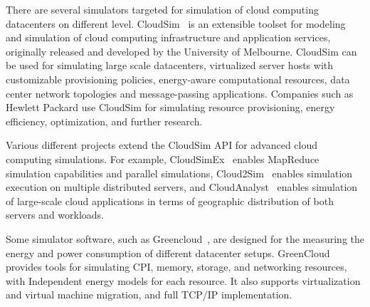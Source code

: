 There are several simulators targeted for simulation of cloud computing datacenters on different level. CloudSim~\cite{Calheiros:2011:Cloudsim} is an extensible toolset for modeling and simulation of cloud computing infrastructure and application services, originally released and developed by the University of Melbourne. CloudSim can be used for simulating large scale datacenters, virtualized server hosts with customizable provisioning policies, energy-aware computational resources, data center network topologies and message-passing applications. Companies such as Hewlett Packard use CloudSim for simulating resource provisioning, energy efficiency, optimization, and further research.

Various different projects extend the CloudSim API for advanced cloud computing simulations. For example, CloudSimEx~\cite{CloudSimEx} enables MapReduce simulation capabilities and parallel simulations, Cloud2Sim~\cite{Kathiravelu:2014:Concurrent} enables simulation execution on multiple distributed servers, and CloudAnalyst~\cite{Wickremasinghe:2010:CloudAnalyst} enables simulation of large-scale cloud applications in terms of geographic distribution of both servers and workloads.

Some simulator software, such as Greencloud~\cite{Kliazovich:2010:GreenCloud}, are designed for the measuring the energy and power consumption of different datacenter setups. GreenCloud provides tools for simulating CPI, memory, storage, and networking resources, with Independent energy models for each resource. It also supports virtualization and virtual machine migration, and full TCP/IP implementation.







